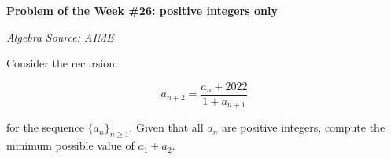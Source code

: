 \begin{potw}\vspace{5pt}
{\large\textbf{Problem of the Week \#26: positive integers only}}\vspace{5pt}

\textit{Algebra}\V
\textit{Source: AIME}\V

Consider the recursion: 

\[a_{n+2} = \frac{a_n + 2022}{1+a_{n+1}}\]

for the sequence $\{a_n\}_{n\geq 1}$. Given that all $a_n$ are positive integers, compute the minimum possible value of $a_1+a_2$.
\end{potw}\V
